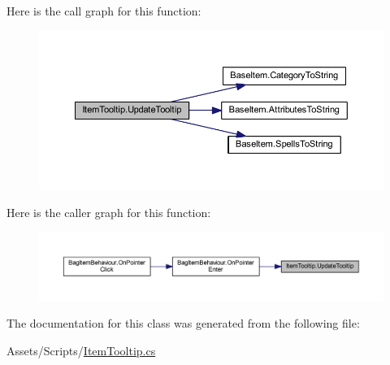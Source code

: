 Here is the call graph for this function\+:
\nopagebreak
\begin{figure}[H]
\begin{center}
\leavevmode
\includegraphics[width=350pt]{class_item_tooltip_a51e15cd0c208c14105cc8bedf452385b_cgraph}
\end{center}
\end{figure}
Here is the caller graph for this function\+:
\nopagebreak
\begin{figure}[H]
\begin{center}
\leavevmode
\includegraphics[width=350pt]{class_item_tooltip_a51e15cd0c208c14105cc8bedf452385b_icgraph}
\end{center}
\end{figure}


The documentation for this class was generated from the following file\+:\begin{DoxyCompactItemize}
\item 
Assets/\+Scripts/\mbox{\hyperlink{_item_tooltip_8cs}{Item\+Tooltip.\+cs}}\end{DoxyCompactItemize}

